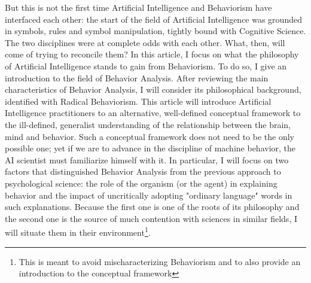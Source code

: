 \documentclass[letterpaper,11pt,twocolumn]{article}
\begin{document}
But this is not the first time Artificial Intelligence and Behaviorism have interfaced each other: the start of the field of Artificial Intelligence was grounded in symbols, rules and symbol manipulation, tightly bound with Cognitive Science. The two disciplines were at complete odds with each other\cite{skinnerCognitiveScienceBehaviourism1985}. What, then, will come of trying to reconcile them? In this article, I focus on what the philosophy of Artificial Intelligence stands to gain from Behaviorism. To do so, I give an introduction to the field of Behavior Analysis. After reviewing the main characteristics of Behavior Analysis, I will consider its philosophical background, identified with Radical Behaviorism. This article will introduce Artificial Intelligence practitioners to an alternative, well-defined conceptual framework to the ill-defined, generalist understanding of the relationship between the brain, mind and behavior. Such a conceptual framework does not need to be the only possible one; yet if we are to advance in the discipline of machine behavior, the AI scientist must familiarize himself with it. In particular, I will focus on two factors that distinguished Behavior Analysis from the previous approach to psychological science: the role of the organism (or the agent) in explaining behavior and the impact of uncritically adopting "ordinary language" words in such explanations. Because the first one is one of the roots of its philosophy and the second one is the source of much contention with sciences in similar fields, I will situate them in their environment\footnote{This is meant to avoid mischaracterizing Behaviorism and to also provide an introduction to the conceptual framework}.
\end{document}
